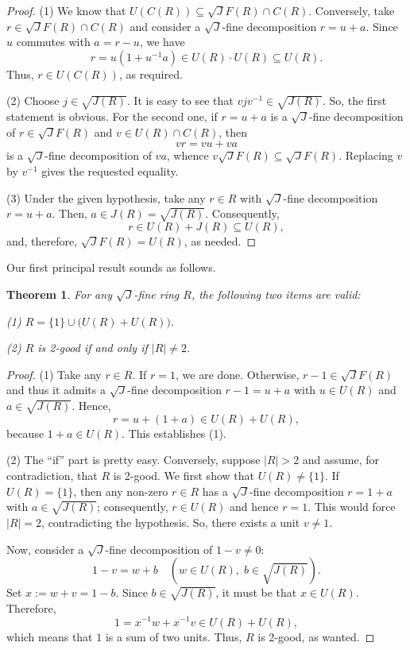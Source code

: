 \documentclass[12pt]{amsart}
\newtheorem{theorem}{Theorem}[section]
\theoremstyle{definition}
\begin{document}
\begin{proof}
(1) We know that \(U(C(R))\subseteq \sqrt{J}F(R) \cap C(R)\). Conversely, take \(r \in  \sqrt{J}F(R)\cap C(R)\) and consider a $\sqrt{J}$-fine decomposition \(r = u + a\). Since \(u\) commutes with \(a = r - u\), we have
	\[
	r = u(1 + u^{-1}a) \in U(R) \cdot U(R) \subseteq U(R).
	\]
Thus, \(r \in U(C(R))\), as required.
	
(2) Choose $j\in \sqrt{J(R)}$. It is easy to see that $vjv^{-1}\in \sqrt{J(R)}$. So, the first statement is obvious. For the second one, if \(r = u + a\) is a $\sqrt{J}$-fine decomposition of \(r \in \sqrt{J}F(R)\) and \(v \in U(R) \cap C(R)\), then
	\[
	vr = vu + va
	\]
is a $\sqrt{J}$-fine decomposition of \(va\), whence \(v\sqrt{J}F(R) \subseteq \sqrt{J}F(R)\). Replacing \(v\) by \(v^{-1}\) gives the requested equality.
	
(3) Under the given hypothesis, take any \(r \in R\) with $\sqrt{J}$-fine decomposition \(r = u + a\). Then, \(a \in J(R)=\sqrt{J(R)}\). Consequently,
	\[
	r \in U(R) + J(R) \subseteq U(R),
	\]
and, therefore, \(\sqrt{J}F(R) = U(R)\), as needed.
\end{proof}

Our first principal result sounds as follows.

\begin{theorem}\label{2-good}
For any $\sqrt{J}$-fine ring \(R\), the following two items are valid:

(1) \(R = \{1\} \cup \bigl(U(R) + U(R)\bigr)\).

(2) \(R\) is 2-good if and only if \(|R| \neq 2\).
\end{theorem}

\begin{proof}
(1) Take any \(r \in R\). If \(r = 1\), we are done. Otherwise, \(r - 1 \in \sqrt{J}F(R)\) and thus it admits a $\sqrt{J}$-fine decomposition \(r - 1 = u + a\) with \(u \in U(R)\) and \(a \in \sqrt{J(R)}\). Hence,
\[
r = u + (1 + a) \in U(R) + U(R),
\]
because \(1 + a \in U(R)\). This establishes (1).
	
(2) The ``if'' part is pretty easy. Conversely, suppose \(|R| > 2\) and assume, for contradiction, that \(R\) is 2-good. We first show that \(U(R) \neq \{1\}\). If \(U(R) = \{1\}\), then any non-zero \(r \in R\) has a $\sqrt{J}$-fine decomposition \(r = 1 + a\) with \(a \in \sqrt{J(R)}\); consequently, \(r \in U(R)\) and hence \(r = 1\). This would force \(|R| = 2\), contradicting the hypothesis. So, there exists a unit \(v \neq 1\).
	
Now, consider a $\sqrt{J}$-fine decomposition of \(1 - v\neq0\):
	\[
	1 - v = w + b \quad (w \in U(R),\; b \in \sqrt{J(R)}).
	\]
Set \(x := w + v = 1 - b\). Since $b \in \sqrt{J(R)}$, it must be that \(x \in U(R)\). Therefore,
	\[
	1 = x^{-1}w + x^{-1}v \in U(R) + U(R),
	\]
which means that \(1\) is a sum of two units. Thus, \(R\) is 2-good, as wanted.
\end{proof}
\end{document}
